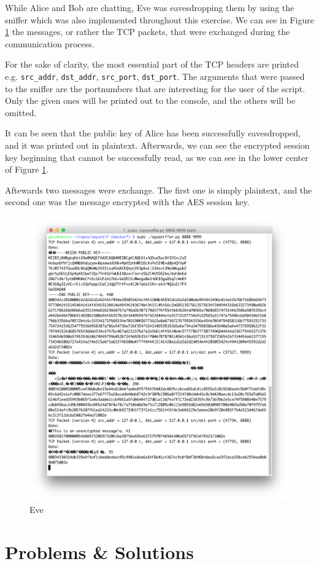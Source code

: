 \documentclass[11pt, a4paper]{article}
\begin{document}
While Alice and Bob are chatting, Eve was eavesdropping them by using
the sniffer which was also implemented throughout this exercise. We
can see in Figure \ref{fig:test_eve} the messages, or rather the TCP
packets, that were exchanged during the communication process. 

For the sake of clarity, the most essential part of the TCP headers
are printed e.g. \lstinline|src_addr|, \lstinline|dst_addr|,
\lstinline|src_port|, \lstinline|dst_port|. The arguments that were
passed to the sniffer are the portnumbers that are interesting for the
user of the script. Only the given ones will be printed out to the
console, and the others will be omitted. 

It can be seen that the public key of Alice has been successfully
eavesdropped, and it was printed out in plaintext. Afterwards, we can
see the encrypted session key beginning that cannot be successfully
read, as we can see in the lower center of Figure \ref{fig:test_eve}. 

Aftewards two messages were exchange. The first one is simply
plaintext, and the second one was the message encrypted with the AES
session key. 

\begin{figure}[H]
  \centering
  \includegraphics[width=0.8\linewidth]{img/test_eve}
  \caption{Eve}
  \label{fig:test_eve}
\end{figure}

\section{Problems \& Solutions}
\end{document}

